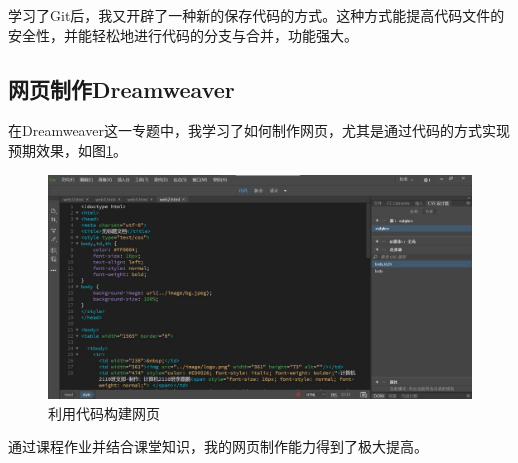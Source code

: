 \documentclass[supercite]{Experimental_Report}
\theoremstyle{definition}
\begin{document}
	学习了Git后，我又开辟了一种新的保存代码的方式。这种方式能提高代码文件的安全性，并能轻松地进行代码的分支与合并，功能强大。
	
	\subsection{网页制作Dreamweaver}
	
	在Dreamweaver这一专题中，我学习了如何制作网页，尤其是通过代码的方式实现预期效果，如图\ref{fig6}。
	
	\begin{figure}[htb]
		\begin{center}
			\includegraphics[scale=0.45]{images/6.jpg}
			\caption{利用代码构建网页}
			\label{fig6}
		\end{center}
	\end{figure}
	
	通过课程作业并结合课堂知识，我的网页制作能力得到了极大提高。
	
	
	\nocite{*} %
	
	
\end{document}
